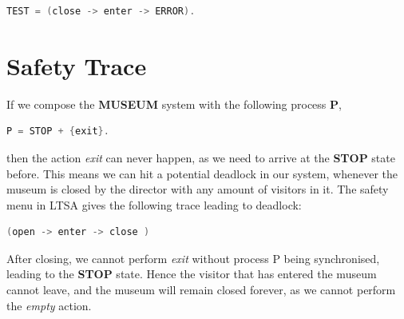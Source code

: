 \documentclass[11pt]{article} %
\begin{document}
\begin{lstlisting}[language=Java]
TEST = (close -> enter -> ERROR).
\end{lstlisting}



\pagebreak
\section{Safety Trace}
If we compose the \textbf{MUSEUM} system with the following process \textbf{P},

\begin{lstlisting}[language=Java]
P = STOP + {exit}.
\end{lstlisting}

then the action \textit{exit} can never happen, as we need to arrive at the \textbf{STOP} state before. This means we can hit a potential deadlock in our system, whenever the museum is closed by the director with any amount of visitors in it. The safety menu in LTSA gives the following trace leading to deadlock:

\begin{lstlisting}[language=Java]
(open -> enter -> close )
\end{lstlisting}

After closing, we cannot perform \textit{exit} without process P being synchronised, leading to the \textbf{STOP} state. Hence the visitor that has entered the museum cannot leave, and the museum will remain closed forever, as we cannot perform the \textit{empty} action.
\end{document}
